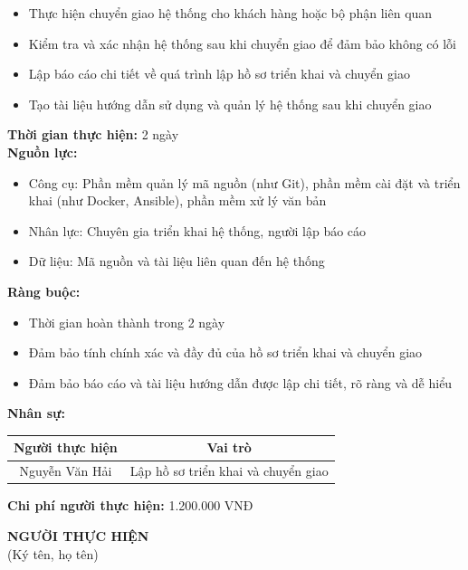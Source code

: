 {\begin{minipage}{\textwidth}
\begin{itemize}
        \item Thực hiện chuyển giao hệ thống cho khách hàng hoặc bộ phận liên quan
        \item Kiểm tra và xác nhận hệ thống sau khi chuyển giao để đảm bảo không có lỗi
        \item Lập báo cáo chi tiết về quá trình lập hồ sơ triển khai và chuyển giao
        \item Tạo tài liệu hướng dẫn sử dụng và quản lý hệ thống sau khi chuyển giao
    \end{itemize}
    \vspace{0.5cm}
    \noindent \textbf{Thời gian thực hiện:} 2 ngày \\
    \noindent \textbf{Nguồn lực:}
    \begin{itemize}
        \item Công cụ: Phần mềm quản lý mã nguồn (như Git), phần mềm cài đặt và triển khai (như Docker, Ansible), phần mềm xử lý văn bản
        \item Nhân lực: Chuyên gia triển khai hệ thống, người lập báo cáo
        \item Dữ liệu: Mã nguồn và tài liệu liên quan đến hệ thống
    \end{itemize}
    \vspace{0.5cm}
    \noindent \textbf{Ràng buộc:}
    \begin{itemize}
        \item Thời gian hoàn thành trong 2 ngày
        \item Đảm bảo tính chính xác và đầy đủ của hồ sơ triển khai và chuyển giao
        \item Đảm bảo báo cáo và tài liệu hướng dẫn được lập chi tiết, rõ ràng và dễ hiểu
    \end{itemize}
    \vspace{0.5cm}
    \noindent \textbf{Nhân sự:}
    \begin{longtable}{|c|c|}
    \hline
    \textbf{Người thực hiện} & \textbf{Vai trò} \\
    \hline
    Nguyễn Văn Hải & Lập hồ sơ triển khai và chuyển giao \\
    \hline
    \end{longtable}
    \vspace{0.5cm}
    \noindent \textbf{Chi phí người thực hiện:} 1.200.000 VNĐ \\
    \vspace{1cm}
    \begin{flushleft}
        \hspace{8cm} \textbf{NGƯỜI THỰC HIỆN} \\
        \hspace{8.8cm} (Ký tên, họ tên) \\
        \vspace{1cm}
    \end{flushleft}
    \end{minipage}
}
% 
